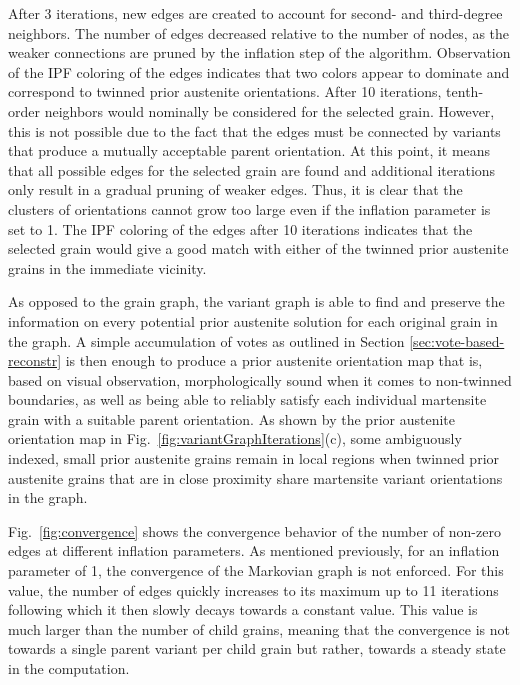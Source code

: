 \documentclass{elsarticle}
\numberwithin{equation}{section}
\begin{document}
After 3 iterations, new edges are created to account for second- and third-degree neighbors. The number of edges decreased relative to the number of nodes, as the weaker connections are pruned by the inflation step of the algorithm. Observation of the IPF coloring of the edges indicates that two colors appear to dominate and correspond to twinned prior austenite orientations. After 10 iterations, tenth-order neighbors would nominally be considered for the selected grain. However, this is not possible due to the fact that the edges must be connected by variants that produce a mutually acceptable parent orientation. At this point, it means that all possible edges for the selected grain are found and additional iterations only result in a gradual pruning of weaker edges. Thus, it is clear that the clusters of orientations cannot grow too large even if the inflation parameter is set to 1. The IPF coloring of the edges after 10 iterations indicates that the selected grain would give a good match with either of the twinned prior austenite grains in the immediate vicinity.

As opposed to the grain graph, the variant graph is able to find and preserve the information on every potential prior austenite solution for each original grain in the graph. A simple accumulation of votes as outlined in Section \ref{sec:vote-based-reconstr} is then enough to produce a prior austenite orientation map that is, based on visual observation, morphologically sound when it comes to non-twinned boundaries, as well as being able to reliably satisfy each individual martensite grain with a suitable parent orientation. As shown by the prior austenite orientation map in Fig.~\ref{fig:variantGraphIterations}(c), some ambiguously indexed, small prior austenite grains remain in local regions when twinned prior austenite grains that are in close proximity share martensite variant orientations in the graph.

Fig.~\ref{fig:convergence} shows the convergence behavior of the number of non-zero edges at different inflation parameters. As mentioned previously, for an inflation parameter of 1, the convergence of the Markovian graph is not enforced. For this value, the number of edges quickly increases to its maximum up to 11 iterations following which it then slowly decays towards a constant value. This value is much larger than the number of child grains, meaning that the convergence is not towards a single parent variant per child grain but rather, towards a steady state in the computation. 
\end{document}
